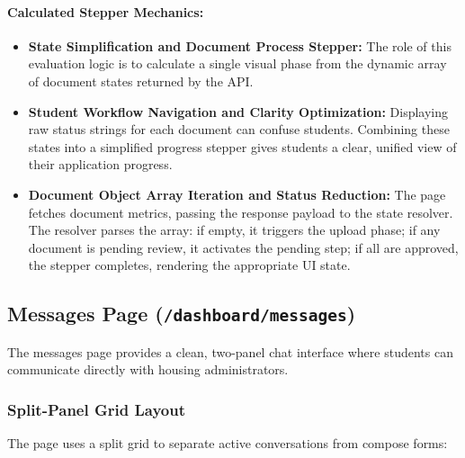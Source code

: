 \documentclass[12pt,a4paper]{article}
\begin{document}
\paragraph{Calculated Stepper Mechanics:}
\begin{itemize}[leftmargin=2em]
    \item \textbf{State Simplification and Document Process Stepper:} The role of this evaluation logic is to calculate a single visual phase from the dynamic array of document states returned by the API.
    \item \textbf{Student Workflow Navigation and Clarity Optimization:} Displaying raw status strings for each document can confuse students. Combining these states into a simplified progress stepper gives students a clear, unified view of their application progress.
    \item \textbf{Document Object Array Iteration and Status Reduction:} The page fetches document metrics, passing the response payload to the state resolver. The resolver parses the array: if empty, it triggers the upload phase; if any document is pending review, it activates the pending step; if all are approved, the stepper completes, rendering the appropriate UI state.
\end{itemize}

\subsection{Messages Page (\texttt{/dashboard/messages})}

The messages page provides a clean, two-panel chat interface where students can communicate directly with housing administrators.

\subsubsection{Split-Panel Grid Layout}

The page uses a split grid to separate active conversations from compose forms:
\end{document}
